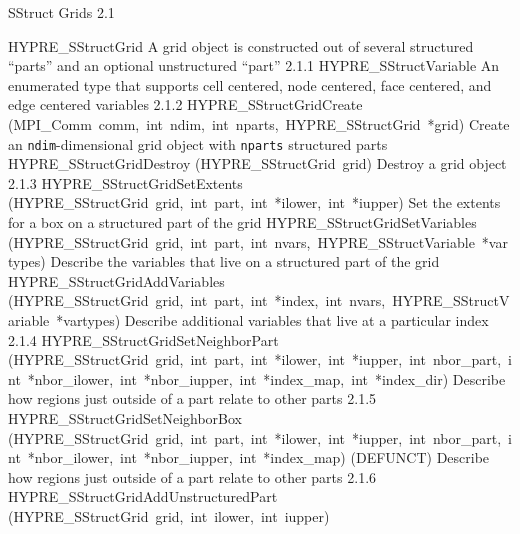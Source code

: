 \documentclass{article}
\begin{document}
\begin{cxxentry}
\begin{cxxdoc}
\end{cxxdoc}
\begin{cxxentry}
{}
        {SStruct Grids}
        {}
        {
}
        {2.1}
\begin{cxxnames}
        {HYPRE\_SStructGrid}
        {}
        {
A grid object is constructed out of several structured ``parts'' and an
optional unstructured ``part''}
        {2.1.1}
        {HYPRE\_SStructVariable}
        {}
        {
An enumerated type that supports cell centered, node centered, face centered,
and edge centered variables}
        {2.1.2}
        {HYPRE\_SStructGridCreate}
        {(MPI\_Comm\ comm,\ int\ ndim,\ int\ nparts,\ HYPRE\_SStructGrid\ *grid)}
        {
Create an {\tt ndim}-dimensional grid object with {\tt nparts} structured
parts}
        {}
\label{cxx.2.1.9}
        {HYPRE\_SStructGridDestroy}
        {(HYPRE\_SStructGrid\ grid)}
        {
Destroy a grid object}
        {2.1.3}
        {HYPRE\_SStructGridSetExtents}
        {(HYPRE\_SStructGrid\ grid,\ int\ part,\ int\ *ilower,\ int\ *iupper)}
        {
Set the extents for a box on a structured part of the grid}
        {}
\label{cxx.2.1.10}
        {HYPRE\_SStructGridSetVariables}
        {(HYPRE\_SStructGrid\ grid,\ int\ part,\ int\ nvars,\ HYPRE\_SStructVariable\ *vartypes)}
        {
Describe the variables that live on a structured part of the grid}
        {}
\label{cxx.2.1.11}
        {HYPRE\_SStructGridAddVariables}
        {(HYPRE\_SStructGrid\ grid,\ int\ part,\ int\ *index,\ int\ nvars,\ HYPRE\_SStructVariable\ *vartypes)}
        {
Describe additional variables that live at a particular index}
        {2.1.4}
        {HYPRE\_SStructGridSetNeighborPart}
        {(HYPRE\_SStructGrid\ grid,\ int\ part,\ int\ *ilower,\ int\ *iupper,\ int\ nbor\_part,\ int\ *nbor\_ilower,\ int\ *nbor\_iupper,\ int\ *index\_map,\ int\ *index\_dir)}
        {
Describe how regions just outside of a part relate to other parts}
        {2.1.5}
        {HYPRE\_SStructGridSetNeighborBox}
        {(HYPRE\_SStructGrid\ grid,\ int\ part,\ int\ *ilower,\ int\ *iupper,\ int\ nbor\_part,\ int\ *nbor\_ilower,\ int\ *nbor\_iupper,\ int\ *index\_map)}
        {
(DEFUNCT) Describe how regions just outside of a part relate to other parts}
        {2.1.6}
        {HYPRE\_SStructGridAddUnstructuredPart}
        {(HYPRE\_SStructGrid\ grid,\ int\ ilower,\ int\ iupper)}

\end{cxxnames}
\end{cxxentry}
\end{cxxentry}
\end{document}
